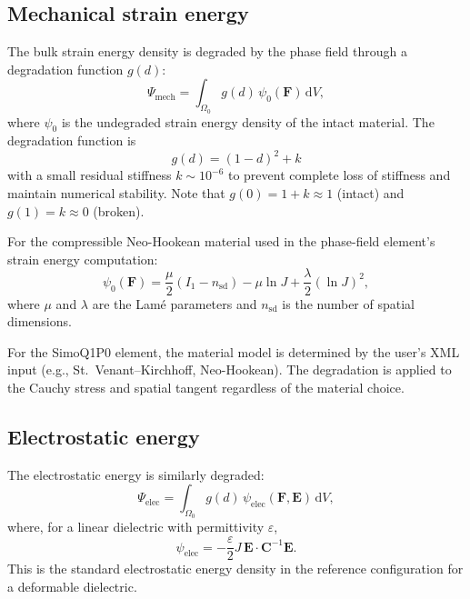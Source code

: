 \documentclass[11pt,a4paper]{article}
\newcommand{\FF}{\bm{F}}
\newcommand{\CC}{\bm{C}}
\newcommand{\EE}{\bm{E}}
\newcommand{\diff}{\mathrm{d}}
\begin{document}
\subsection{Mechanical strain energy}

The bulk strain energy density is degraded by the phase field through a degradation function $g(d)$:
\begin{equation}
    \Psi_{\mathrm{mech}} = \int_{\Omega_0} g(d)\, \psi_0(\FF) \, \diff V,
\end{equation}
where $\psi_0$ is the undegraded strain energy density of the intact material. The degradation function is
\begin{equation}
    \boxed{g(d) = (1-d)^2 + k}
\end{equation}
with a small residual stiffness $k \sim 10^{-6}$ to prevent complete loss of stiffness and maintain numerical stability. Note that $g(0) = 1 + k \approx 1$ (intact) and $g(1) = k \approx 0$ (broken).

For the compressible Neo-Hookean material used in the phase-field element's strain energy computation:
\begin{equation}
    \psi_0(\FF) = \frac{\mu}{2}(I_1 - n_{\mathrm{sd}}) - \mu \ln J + \frac{\lambda}{2}(\ln J)^2,
\end{equation}
where $\mu$ and $\lambda$ are the Lam\'{e} parameters and $n_{\mathrm{sd}}$ is the number of spatial dimensions.

For the SimoQ1P0 element, the material model is determined by the user's XML input (e.g., St.~Venant--Kirchhoff, Neo-Hookean). The degradation is applied to the Cauchy stress and spatial tangent regardless of the material choice.

\subsection{Electrostatic energy}

The electrostatic energy is similarly degraded:
\begin{equation}
    \Psi_{\mathrm{elec}} = \int_{\Omega_0} g(d)\, \psi_{\mathrm{elec}}(\FF, \EE) \, \diff V,
\end{equation}
where, for a linear dielectric with permittivity $\varepsilon$,
\begin{equation}
    \psi_{\mathrm{elec}} = -\frac{\varepsilon}{2} J\, \EE \cdot \CC^{-1} \EE.
\end{equation}
This is the standard electrostatic energy density in the reference configuration for a deformable dielectric.
\end{document}
